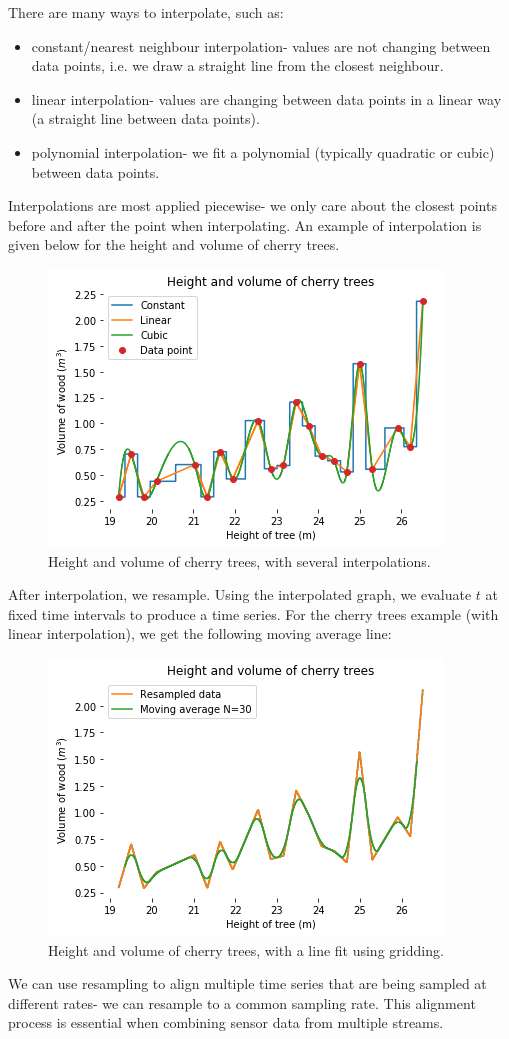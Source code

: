 \documentclass[a4paper, openany]{memoir}
\begin{document}
There are many ways to interpolate, such as:
\begin{itemize}
    \item constant/nearest neighbour interpolation- values are not changing between data points, i.e. we draw a straight line from the closest neighbour.
    \item linear interpolation- values are changing between data points in a linear way (a straight line between data points).
    \item polynomial interpolation- we fit a polynomial (typically quadratic or cubic) between data points.
\end{itemize}
Interpolations are most applied piecewise- we only care about the closest points before and after the point when interpolating. An example of interpolation is given below for the height and volume of cherry trees.
\begin{figure}[H]
    \centering
    \includegraphics[scale=0.6]{src/6.5 height and volume of cherry trees with gridding.png}
    \caption{Height and volume of cherry trees, with several interpolations.}
\end{figure}
After interpolation, we resample. Using the interpolated graph, we evaluate $t$ at fixed time intervals to produce a time series. For the cherry trees example (with linear interpolation), we get the following moving average line:
\begin{figure}[H]
    \centering
    \includegraphics[scale=0.6]{src/6.6 height and volume of cherry trees with sampled.png}
    \caption{Height and volume of cherry trees, with a line fit using gridding.}
\end{figure}
We can use resampling to align multiple time series that are being sampled at different rates- we can resample to a common sampling rate. This alignment process is essential when combining sensor data from multiple streams.
\end{document}
